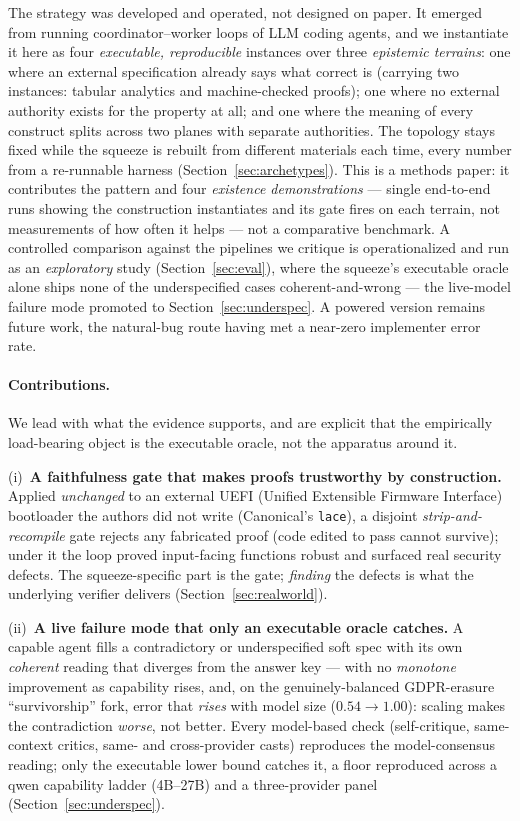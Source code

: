 \documentclass[11pt]{article}
\newcommand{\code}[1]{\texttt{#1}}
\begin{document}
The strategy was developed and operated, not designed on paper. It emerged from running
coordinator--worker loops of LLM coding agents, and we instantiate it here as four
\emph{executable, reproducible} instances over three \emph{epistemic terrains}: one where an
external specification already says what correct is (carrying two instances: tabular analytics
and machine-checked proofs); one where no external authority exists for the property at all; and
one where the meaning of every construct splits across two planes with separate authorities. The
topology stays fixed while the squeeze is rebuilt from different materials each time, every
number from a re-runnable harness (Section~\ref{sec:archetypes}). This is a methods paper: it
contributes the pattern and four \emph{existence demonstrations} --- single end-to-end runs showing
the construction instantiates and its gate fires on each terrain, not measurements of how often it
helps --- not a comparative benchmark. A
controlled comparison against the pipelines we critique is operationalized and run as an
\emph{exploratory} study (Section~\ref{sec:eval}), where the squeeze's executable oracle alone
ships none of the underspecified cases coherent-and-wrong --- the live-model failure mode
promoted to Section~\ref{sec:underspec}. A powered version remains future work, the natural-bug
route having met a near-zero implementer error rate.

\paragraph{Contributions.} We lead with what the evidence supports, and are explicit that the
empirically load-bearing object is the executable oracle, not the apparatus around it.

(i)~\textbf{A faithfulness gate that makes proofs trustworthy by construction.} Applied \emph{unchanged}
to an external UEFI (Unified Extensible Firmware Interface) bootloader the authors did not write
(Canonical's \code{lace}), a disjoint \emph{strip-and-recompile} gate rejects any fabricated proof (code
edited to pass cannot survive); under it the loop proved \ResRWRobust{} input-facing functions robust and
surfaced \ResRWBugsNum{} real security defects. The squeeze-specific part is the gate; \emph{finding} the
defects is what the underlying verifier delivers (Section~\ref{sec:realworld}).

(ii)~\textbf{A live failure mode that only an executable oracle catches.} A capable agent fills a
contradictory or underspecified soft spec with its own \emph{coherent} reading that diverges from the
answer key --- with no \emph{monotone} improvement as capability rises, and, on the genuinely-balanced
GDPR-erasure ``survivorship'' fork, error that \emph{rises} with model size ($0.54\!\to\!1.00$): scaling
makes the contradiction \emph{worse}, not better. Every model-based check (self-critique, same-context
critics, same- and cross-provider casts) reproduces the model-consensus reading; only the executable
lower bound catches it, a floor reproduced across a qwen capability ladder (4B--27B) and a three-provider
panel (Section~\ref{sec:underspec}).
\end{document}

